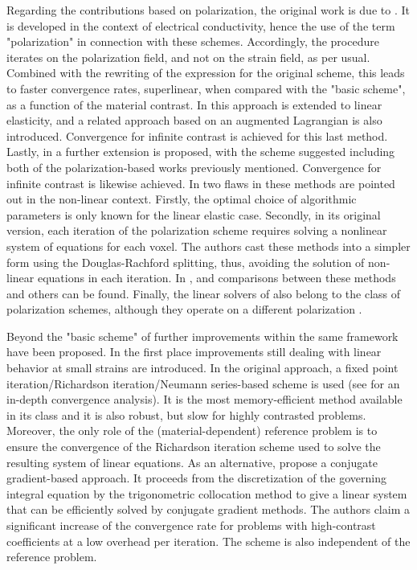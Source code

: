 Regarding the contributions based on polarization, the original work is due to \cite{eyre_fast_1999}.
It is developed in the context of electrical conductivity, hence the use of the term "polarization" in connection with these schemes.
Accordingly, the procedure iterates on the polarization field, and not on the strain field, as per usual.
Combined with the rewriting of the expression for the original scheme, this leads to faster convergence rates, superlinear, when compared with the "basic scheme", as a function of the material contrast.
In \cite{michel_computational_2001} this approach is extended to linear elasticity, and a related approach based on an augmented Lagrangian is also introduced.
Convergence for infinite contrast is achieved for this last method.
Lastly, in \cite{monchiet_polarization-based_2012} a further extension is proposed, with the scheme suggested including both of the polarization-based works previously mentioned.
Convergence for infinite contrast is likewise achieved.
In \cite{schneider_polarization-based_2019} two flaws in these methods are pointed out in the non-linear context.
Firstly, the optimal choice of algorithmic parameters is only known for the linear elastic case.
Secondly, in its original version, each iteration of the polarization scheme requires solving a nonlinear system of equations for each voxel.
The authors cast these methods into a simpler form using the Douglas-Rachford splitting, thus, avoiding the solution of non-linear equations in each iteration.
In \cite{moulinec_comparison_2014}, \cite{moulinec_comparison_2014-1} and \cite{schneider_polarization-based_2019} comparisons between these methods and others can be found.
Finally, the linear solvers of \cite{brisard_fft-based_2010, brisard_combining_2012} also belong to the class of polarization schemes, although they operate on a different polarization \citep{schneider_lippmannschwinger_2020}.

Beyond the "basic scheme" of \cite{moulinec_fast_1994} further improvements within the same framework have been proposed.
In the first place improvements still dealing with linear behavior at small strains are introduced.
In the original approach, a fixed point iteration/Richardson iteration/Neumann series-based scheme is used (see \cite{moulinec_convergence_2018} for an in-depth convergence analysis).
It is the most memory-efficient method available in its class and it is also robust, but slow for highly contrasted problems.
Moreover, the only role of the (material-dependent) reference problem is to ensure the convergence of the Richardson iteration scheme used to solve the resulting system of linear equations.
As an alternative, \cite{zeman_accelerating_2010} propose a conjugate gradient-based approach.
It proceeds from the discretization of the governing integral equation by the trigonometric collocation method to give a linear system that can be efficiently solved by conjugate gradient methods.
The authors claim a significant increase of the convergence rate for problems with high-contrast coefficients at a low overhead per iteration.
The scheme is also independent of the reference problem.

